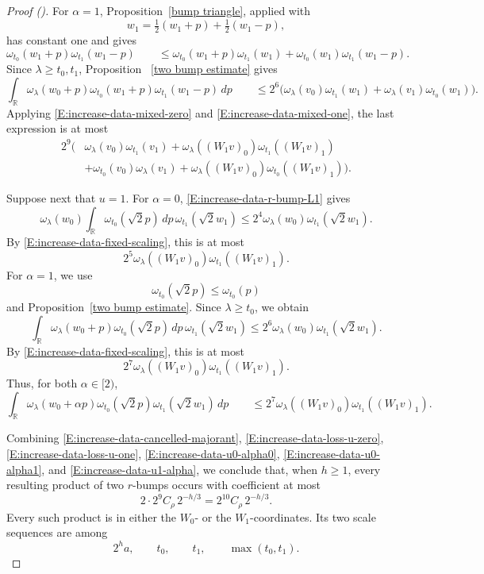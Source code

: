 \documentclass[12pt,reqno]{amsart}
\newcommand{\auto}{{({\tiny\faCar})}}
\theoremstyle{plain}
\numberwithin{equation}{section}
\theoremstyle{remark}
\begin{document}
\begin{proof}[Proof \auto]
For \(\alpha=1\), Proposition~\ref{bump triangle}, applied with
\[
w_1
=
\tfrac12(w_1+p)+\tfrac12(w_1-p),
\]
has constant one and gives
\begin{equation}
    \label{E:increase-data-narrow-triangle}
    \omega_{t_0}(w_1+p) \omega_{t_1}(w_1-p) \qquad\leq \omega_{t_0}(w_1+p)\omega_{t_1}(w_1) + \omega_{t_0}(w_1)\omega_{t_1}(w_1-p).
\end{equation}
Since \(\lambda\geq t_0,t_1\), Proposition~
\ref{two bump estimate} gives
\[
\int_{\mathbb R} \omega_\lambda(w_0+p) \omega_{t_0}(w_1+p) \omega_{t_1}(w_1-p)\,dp \qquad\leq 2^6\Big( \omega_\lambda(v_0)\omega_{t_1}(w_1) + \omega_\lambda(v_1)\omega_{t_0}(w_1) \Big).
\]
Applying \eqref{E:increase-data-mixed-zero} and
\eqref{E:increase-data-mixed-one}, the last expression is at most
\begin{equation}
    \label{E:increase-data-u0-alpha1}
    \begin{aligned}
2^9\Big(
&
\omega_\lambda(v_0)\omega_{t_1}(v_1)
+
\omega_\lambda((W_1v)_0)
\omega_{t_1}((W_1v)_1)
\\
&+
\omega_{t_0}(v_0)\omega_\lambda(v_1)
+
\omega_\lambda((W_1v)_0)
\omega_{t_0}((W_1v)_1)
\Big).
\end{aligned}
\end{equation}

Suppose next that \(u=1\). For \(\alpha=0\),
\eqref{E:increase-data-r-bump-L1} gives
\[
\omega_\lambda(w_0)
\int_{\mathbb R}\omega_{t_0}(\sqrt2p)\,dp\,
\omega_{t_1}(\sqrt2w_1)
\leq
2^4\omega_\lambda(w_0)\omega_{t_1}(\sqrt2w_1).
\]
By \eqref{E:increase-data-fixed-scaling}, this is at most
\[
2^5\omega_\lambda((W_1v)_0)\omega_{t_1}((W_1v)_1).
\]
For \(\alpha=1\), we use
\[
\omega_{t_0}(\sqrt2p)\leq\omega_{t_0}(p)
\]
and Proposition~\ref{two bump estimate}. Since
\(\lambda\geq t_0\), we obtain
\[
\int_{\mathbb R}\omega_\lambda(w_0+p)\omega_{t_0}(\sqrt2p)\,dp\,
\omega_{t_1}(\sqrt2w_1)
\leq
2^6\omega_\lambda(w_0)\omega_{t_1}(\sqrt2w_1).
\]
By \eqref{E:increase-data-fixed-scaling}, this is at most
\[
2^7\omega_\lambda((W_1v)_0)\omega_{t_1}((W_1v)_1).
\]
Thus, for both \(\alpha\in[2)\),
\begin{equation}
    \label{E:increase-data-u1-alpha}
    \int_{\mathbb R} \omega_\lambda(w_0+\alpha p) \omega_{t_0}(\sqrt2p) \omega_{t_1}(\sqrt2w_1)\,dp \qquad\leq 2^7 \omega_\lambda((W_1v)_0) \omega_{t_1}((W_1v)_1).
\end{equation}

Combining
\eqref{E:increase-data-cancelled-majorant},
\eqref{E:increase-data-loss-u-zero},
\eqref{E:increase-data-loss-u-one},
\eqref{E:increase-data-u0-alpha0},
\eqref{E:increase-data-u0-alpha1}, and
\eqref{E:increase-data-u1-alpha}, we conclude that, when
\(h\geq1\), every resulting product of two \(r\)-bumps occurs with
coefficient at most
\[
2\cdot2^9 C_\rho\,2^{-h/3}
=
2^{10}C_\rho\,2^{-h/3}.
\]
Every such product is in either the \(W_0\)- or the
\(W_1\)-coordinates. Its two scale sequences are among
\[
2^ha,\qquad
t_0,\qquad
t_1,\qquad
\max(t_0,t_1).
\]


\end{proof}
\end{document}
